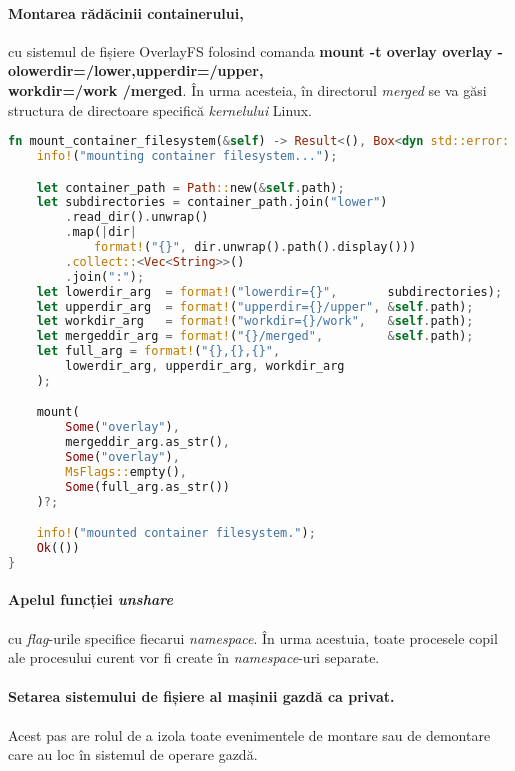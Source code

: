             \paragraph{Montarea rădăcinii containerului,} cu sistemul de fișiere OverlayFS folosind comanda \textbf{mount -t overlay overlay -olowerdir=/lower,upperdir=/upper,\\workdir=/work /merged}. În urma acesteia, în directorul \textit{merged} se va găsi structura de directoare specifică \textit{kernelului} Linux.
            \begin{lstlisting}[language=Rust, style=boxed, caption={Montarea directorului în care este sistemul de fișiere al containerului},captionpos=b]
fn mount_container_filesystem(&self) -> Result<(), Box<dyn std::error::Error>> {
    info!("mounting container filesystem...");

    let container_path = Path::new(&self.path);
    let subdirectories = container_path.join("lower")
        .read_dir().unwrap()
        .map(|dir|
            format!("{}", dir.unwrap().path().display()))
        .collect::<Vec<String>>()
        .join(":");
    let lowerdir_arg  = format!("lowerdir={}",       subdirectories);
    let upperdir_arg  = format!("upperdir={}/upper", &self.path);
    let workdir_arg   = format!("workdir={}/work",   &self.path);
    let mergeddir_arg = format!("{}/merged",         &self.path);
    let full_arg = format!("{},{},{}",
        lowerdir_arg, upperdir_arg, workdir_arg
    );

    mount(
        Some("overlay"),
        mergeddir_arg.as_str(),
        Some("overlay"),
        MsFlags::empty(),
        Some(full_arg.as_str())
    )?;

    info!("mounted container filesystem.");
    Ok(())
}           \end{lstlisting}
            \label{fig:cod_cmount}
            \paragraph{Apelul funcției \textit{unshare}} cu \textit{flag}-urile specifice fiecarui \textit{namespace}. În urma acestuia, toate procesele copil ale procesului curent vor fi create în \textit{namespace}-uri separate.
            \paragraph{Setarea sistemului de fișiere al mașinii gazdă ca privat.} Acest pas are rolul de a izola toate evenimentele de montare sau de demontare care au loc în sistemul de operare gazdă.
